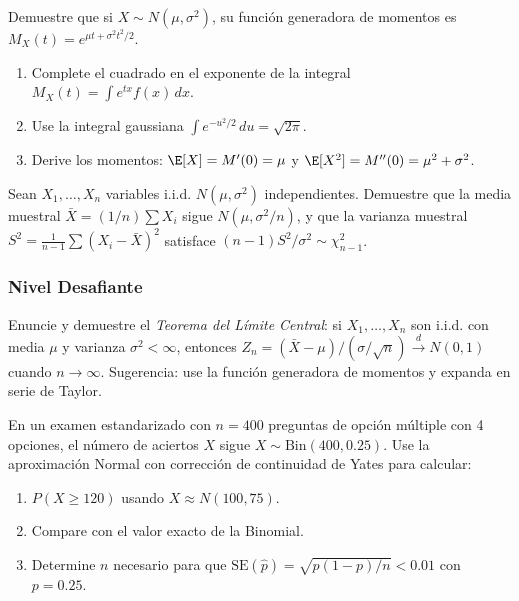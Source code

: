 \begin{problema}
	\label{prob:4.6.7}
	Demuestre que si $X \sim N(\mu, \sigma^{2})$, su función generadora de momentos es $M_{X}(t) = e^{\mu t + \sigma^{2} t^{2}/2}$.
	\begin{enumerate}
		\item Complete el cuadrado en el exponente de la integral $M_{X}(t) = \int e^{tx} f(x)\,dx$.
		\item Use la integral gaussiana $\int e^{-u^{2}/2}\,du = \sqrt{2\pi}$.
		\item Derive los momentos: $\E[X] = M'(0) = \mu$ y $\E[X^{2}] = M''(0) = \mu^{2} + \sigma^{2}$.
	\end{enumerate}
\end{problema}

\begin{problema}
	\label{prob:4.6.8}
	Sean $X_{1}, \dots, X_{n}$ variables i.i.d. $N(\mu, \sigma^{2})$ independientes. Demuestre que la media muestral $\bar{X} = (1/n) \sum X_{i}$ sigue $N(\mu, \sigma^{2}/n)$, y que la varianza muestral $S^{2} = \frac{1}{n-1}\sum(X_{i} - \bar{X})^{2}$ satisface $(n-1)S^{2}/\sigma^{2} \sim \chi^{2}_{n-1}$.
\end{problema}

\subsubsection*{Nivel Desafiante}

\begin{problema}
	\label{prob:4.6.9}
	Enuncie y demuestre el \emph{Teorema del Límite Central}: si $X_{1}, \dots, X_{n}$ son i.i.d. con media $\mu$ y varianza $\sigma^{2} < \infty$, entonces $Z_{n} = (\bar{X} - \mu)/(\sigma/\sqrt{n}) \xrightarrow{d} N(0, 1)$ cuando $n \to \infty$. Sugerencia: use la función generadora de momentos y expanda en serie de Taylor.
\end{problema}

\begin{problema}
	\label{prob:4.6.10}
	En un examen estandarizado con $n = 400$ preguntas de opción múltiple con 4 opciones, el número de aciertos $X$ sigue $X \sim \text{Bin}(400, 0.25)$. Use la aproximación Normal con corrección de continuidad de Yates para calcular:
	\begin{enumerate}
		\item $P(X \ge 120)$ usando $X \approx N(100, 75)$.
		\item Compare con el valor exacto de la Binomial.
		\item Determine $n$ necesario para que $\text{SE}(\hat{p}) = \sqrt{p(1-p)/n} < 0.01$ con $p = 0.25$.
	\end{enumerate}
\end{problema}

